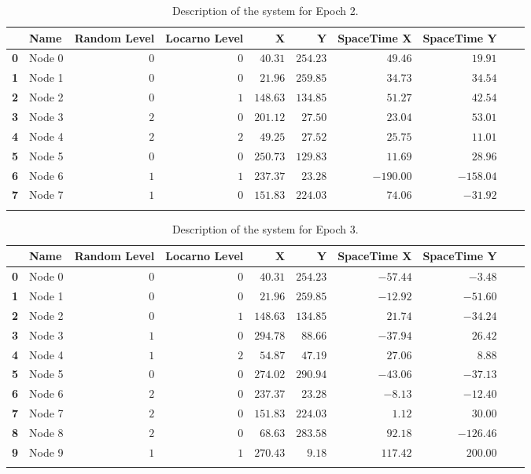 \documentclass[a4paper,11pt,twoside=semi,openright]{report}
\begin{document}
\begin{table}[h]
\centering
\tiny
\begin{tabular}{@{}llrrrrrrll@{}}
\toprule
& \textbf{Name}   &\textbf{Random Level} &\textbf{Locarno Level} & \textbf{X} & \textbf{Y} & \textbf{SpaceTime X} & \textbf{SpaceTime Y}  \\ \midrule
\textbf{0} & Node 0&$0$&$0$&$40.31$&$254.23$&$49.46$&$19.91$&\\ \hdashline
\textbf{1} & Node 1&$0$&$0$&$21.96$&$259.85$&$34.73$&$34.54$&\\ \hdashline
\textbf{2} & Node 2&$0$&$1$&$148.63$&$134.85$&$51.27$&$42.54$&\\ \hdashline
\textbf{3} & Node 3&$2$&$0$&$201.12$&$27.50$&$23.04$&$53.01$&\\ \hdashline
\textbf{4} & Node 4&$2$&$2$&$49.25$&$27.52$&$25.75$&$11.01$&\\ \hdashline
\textbf{5} & Node 5&$0$&$0$&$250.73$&$129.83$&$11.69$&$28.96$&\\ \hdashline
\textbf{6} & Node 6&$1$&$1$&$237.37$&$23.28$&$-190.00$&$-158.04$&\\ \hdashline
\textbf{7} & Node 7&$1$&$0$&$151.83$&$224.03$&$74.06$&$-31.92$&\\ \hdashline\midrule
\bottomrule
\end{tabular}
\caption{Description of the system for Epoch 2.}
\end{table}

\begin{table}[h]
\centering
\tiny
\begin{tabular}{@{}llrrrrrrll@{}}
\toprule
& \textbf{Name}   &\textbf{Random Level} &\textbf{Locarno Level} & \textbf{X} & \textbf{Y} & \textbf{SpaceTime X} & \textbf{SpaceTime Y}  \\ \midrule
\textbf{0} & Node 0&$0$&$0$&$40.31$&$254.23$&$-57.44$&$-3.48$&\\ \hdashline
\textbf{1} & Node 1&$0$&$0$&$21.96$&$259.85$&$-12.92$&$-51.60$&\\ \hdashline
\textbf{2} & Node 2&$0$&$1$&$148.63$&$134.85$&$21.74$&$-34.24$&\\ \hdashline
\textbf{3} & Node 3&$1$&$0$&$294.78$&$88.66$&$-37.94$&$26.42$&\\ \hdashline
\textbf{4} & Node 4&$1$&$2$&$54.87$&$47.19$&$27.06$&$8.88$&\\ \hdashline
\textbf{5} & Node 5&$0$&$0$&$274.02$&$290.94$&$-43.06$&$-37.13$&\\ \hdashline
\textbf{6} & Node 6&$2$&$0$&$237.37$&$23.28$&$-8.13$&$-12.40$&\\ \hdashline
\textbf{7} & Node 7&$2$&$0$&$151.83$&$224.03$&$1.12$&$30.00$&\\ \hdashline
\textbf{8} & Node 8&$2$&$0$&$68.63$&$283.58$&$92.18$&$-126.46$&\\ \hdashline
\textbf{9} & Node 9&$1$&$1$&$270.43$&$9.18$&$117.42$&$200.00$&\\ \hdashline\midrule
\bottomrule
\end{tabular}
\caption{Description of the system for Epoch 3.}
\end{table}
\end{document}
